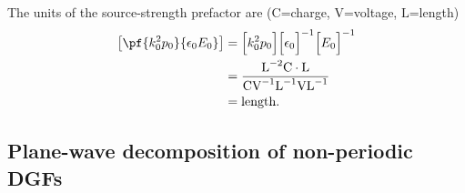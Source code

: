 \documentclass[letterpaper]{article}
\begin{document}
The units of the source-strength prefactor are
($\text{C}$=charge, $\text{V}$=voltage, $\text{L}$=length)
\begin{align*}
\left[\pf{k_0^2 p_0}{\epsilon_0 E_0}\right]
&= \Big[k_0^2 p_0\Big]\Big[\epsilon_0\Big]^{-1} \Big[E_0\Big]^{-1} 
\\
&= \frac{\text{L}^{-2} \text{C}\cdot \text{L}}
        {\text{C} \text{V}^{-1} \text{L}^{-1} \text{V} \text{L}^{-1}}
\\
&= \text{length}.
\end{align*}

\subsection{Plane-wave decomposition of non-periodic DGFs}
\end{document}
